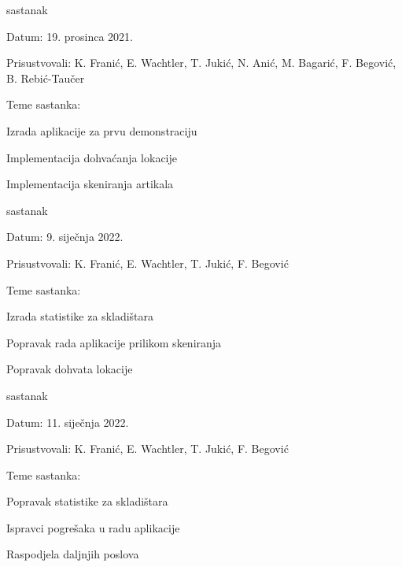 \begin{packed_enum}
			\item sastanak
			\item[] \begin{packed_item}
				\item Datum: 19. prosinca 2021.
				\item Prisustvovali: K. Franić, E. Wachtler, T. Jukić, N. Anić, M. Bagarić, F. Begović, B. Rebić-Taučer
				\item Teme sastanka:
				\begin{packed_item}
					\item  Izrada aplikacije za prvu demonstraciju
					\item  Implementacija dohvaćanja lokacije
					\item  Implementacija skeniranja artikala
				\end{packed_item}
			\end{packed_item}
		
			\item sastanak
			\item[] \begin{packed_item}
				\item Datum: 9. siječnja 2022.
				\item Prisustvovali: K. Franić, E. Wachtler, T. Jukić, F. Begović
				\item Teme sastanka:
				\begin{packed_item}
					\item  Izrada statistike za skladištara
					\item  Popravak rada aplikacije prilikom skeniranja
					\item  Popravak dohvata lokacije
				\end{packed_item}
			\end{packed_item}
		
			\item sastanak
			\item[] \begin{packed_item}
				\item Datum: 11. siječnja 2022.
				\item Prisustvovali: K. Franić, E. Wachtler, T. Jukić, F. Begović
				\item Teme sastanka:
				\begin{packed_item}
					\item  Popravak statistike za skladištara
					\item  Ispravci pogrešaka u radu aplikacije
					\item  Raspodjela daljnjih poslova
				\end{packed_item}
			\end{packed_item}
			
			
		\end{packed_enum}
		
